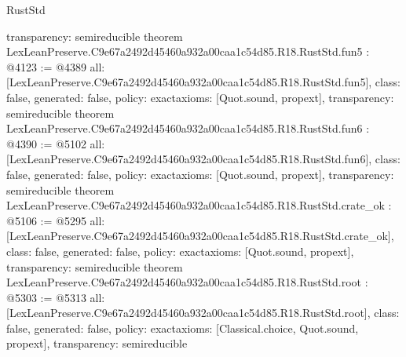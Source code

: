 \begin{lexlean}{RustStd}
\begin{coremodule}
{  transparency: semireducible
}
theorem LexLeanPreserve.C9e67a2492d45460a932a00caa1c54d85.R18.RustStd.fun5 : @4123 := @4389 {
  all: [LexLeanPreserve.C9e67a2492d45460a932a00caa1c54d85.R18.RustStd.fun5],
  class: false,
  generated: false,
  policy: exact{axioms: [Quot.sound, propext]},
  transparency: semireducible
}
theorem LexLeanPreserve.C9e67a2492d45460a932a00caa1c54d85.R18.RustStd.fun6 : @4390 := @5102 {
  all: [LexLeanPreserve.C9e67a2492d45460a932a00caa1c54d85.R18.RustStd.fun6],
  class: false,
  generated: false,
  policy: exact{axioms: [Quot.sound, propext]},
  transparency: semireducible
}
theorem LexLeanPreserve.C9e67a2492d45460a932a00caa1c54d85.R18.RustStd.crate_ok : @5106 := @5295 {
  all: [LexLeanPreserve.C9e67a2492d45460a932a00caa1c54d85.R18.RustStd.crate_ok],
  class: false,
  generated: false,
  policy: exact{axioms: [Quot.sound, propext]},
  transparency: semireducible
}
theorem LexLeanPreserve.C9e67a2492d45460a932a00caa1c54d85.R18.RustStd.root : @5303 := @5313 {
  all: [LexLeanPreserve.C9e67a2492d45460a932a00caa1c54d85.R18.RustStd.root],
  class: false,
  generated: false,
  policy: exact{axioms: [Classical.choice, Quot.sound, propext]},
  transparency: semireducible
}


\end{coremodule}
\end{lexlean}
